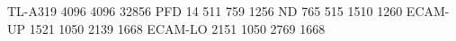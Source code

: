 TL-A319 4096 4096 32856
PFD       14  511  759 1256
ND       765  515 1510 1260
ECAM-UP 1521 1050 2139 1668
ECAM-LO 2151 1050 2769 1668
